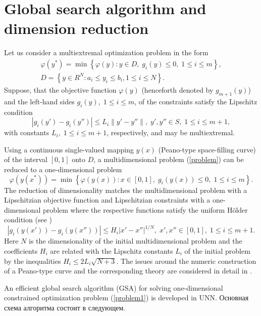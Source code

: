 \documentclass{llncs}
\begin{document}
\section{Global search algorithm and dimension reduction}

Let us consider a multiextremal optimization problem in the form
\begin{gather}\label{problem}
\varphi(y^\ast)=\min{\left\{\varphi(y):y\in D, \; g_i(y)\leq 0, \; 1 \leq i \leq m\right\}},\\
D=\left\{y\in R^N: a_i\leq y_i \leq b_i, 1\leq i \leq N\right\}.
\end{gather}
Suppose, that the objective function $\varphi(y)$ (henceforth denoted by $g_{m+1}(y)$) and
the left-hand sides $g_i(y), \; 1\leq i \leq m$, of the constraints satisfy the Lipschitz condition
\[ 
\left|g_i(y')-g_i (y'')\right| \leq L_i \left\|y'-y'' \right\|, \; y',y''\in S, \; 1\leq i \leq m+1, 
\]
with constants $L_i, \; 1 \leq i \leq m+1$, respectively,  and may be multiextremal.

Using a continuous single-valued mapping $y(x)$  (Peano-type space-filling curve) of the interval $[0,1]$ onto $D$, a multidimensional problem (\ref{problem}) can be reduced to a one-dimensional problem
\begin{equation}\label{problem1}
\varphi(y(x^\ast))=\min \left\{\varphi(y(x)): x \in [0,1], \; g_i(y(x))\leq 0, \; 1 \leq i \leq m\right\}.
\end{equation}
The reduction of dimensionality matches the multidimensional problem with a Lipschitzian objective function and Lipschitzian constraints with a one-dimensional problem where the respective functions satisfy the uniform H\"older condition (see \cite{Strongin2000})
\[
\left|g_i(y(x'))-g_i (y(x''))\right| \leq H_i \left|x'-x'' \right|^{1/N}, \; x',x''\in [0,1], \; 1\leq i \leq m+1.
\]
Here $N$ is the dimensionality of the initial multidimensional problem and the coefficients $H_i$ are related with the Lipschitz constants $L_i$ of the initial problem by the inequalities $H_i \leq 2L_i \sqrt{N+3}$. The issues around the numeric construction of a Peano-type curve and the corresponding theory are considered in detail in \cite{Strongin2000,Strongin2013}.

An efficient global search algorithm (GSA) for solving one-dimensional constrained optimization problem (\ref{problem1}) is developed in UNN. \Russian Основная схема алгоритма состоит в следующем.
\end{document}
